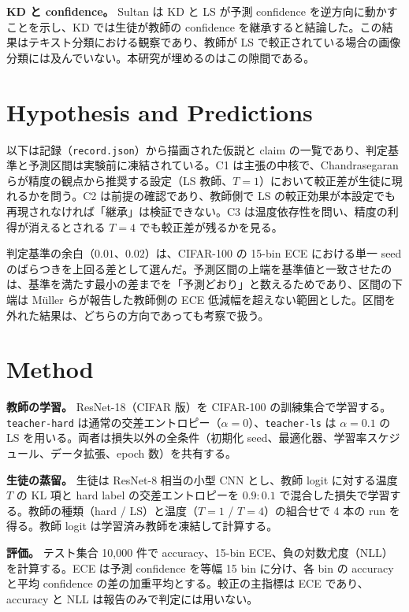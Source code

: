 \documentclass[journal,article,submit,moreauthors]{Definitions/mdpi}
\begin{document}
\textbf{KD と confidence。} Sultan は KD と LS が予測 confidence を逆方向に動かすことを示し、KD では生徒が教師の confidence を継承すると結論した\cite[s3.p1]{sultan-2023-knowledge}。この結果はテキスト分類における観察であり\cite[s3.p2]{sultan-2023-knowledge}、教師が LS で較正されている場合の画像分類には及んでいない。本研究が埋めるのはこの隙間である。

\section{Hypothesis and Predictions}
\label{sec:hypothesis}

以下は記録（\texttt{record.json}）から描画された仮説と claim の一覧であり、判定基準と予測区間は実験前に凍結されている。C1 は主張の中核で、Chandrasegaran らが精度の観点から推奨する設定（LS 教師、$T=1$）において較正差が生徒に現れるかを問う。C2 は前提の確認であり、教師側で LS の較正効果が本設定でも再現されなければ「継承」は検証できない。C3 は温度依存性を問い、精度の利得が消えるとされる $T=4$ でも較正差が残るかを見る。

判定基準の余白（$0.01$、$0.02$）は、CIFAR-100 の 15-bin ECE における単一 seed のばらつきを上回る差として選んだ。予測区間の上端を基準値と一致させたのは、基準を満たす最小の差までを「予測どおり」と数えるためであり、区間の下端は Müller らが報告した教師側の ECE 低減幅を超えない範囲とした。区間を外れた結果は、どちらの方向であっても考察で扱う。



\section{Method}

\textbf{教師の学習。} ResNet-18（CIFAR 版）を CIFAR-100 の訓練集合で学習する。\texttt{teacher-hard} は通常の交差エントロピー（$\alpha=0$）、\texttt{teacher-ls} は $\alpha=0.1$ の LS を用いる。両者は損失以外の全条件（初期化 seed、最適化器、学習率スケジュール、データ拡張、epoch 数）を共有する。

\textbf{生徒の蒸留。} 生徒は ResNet-8 相当の小型 CNN とし、教師 logit に対する温度 $T$ の KL 項と hard label の交差エントロピーを $0.9:0.1$ で混合した損失で学習する。教師の種類（hard / LS）と温度（$T=1$ / $T=4$）の組合せで 4 本の run を得る。教師 logit は学習済み教師を凍結して計算する。

\textbf{評価。} テスト集合 10{,}000 件で accuracy、15-bin ECE、負の対数尤度（NLL）を計算する。ECE は予測 confidence を等幅 15 bin に分け、各 bin の accuracy と平均 confidence の差の加重平均とする。較正の主指標は ECE であり、accuracy と NLL は報告のみで判定には用いない。
\end{document}
